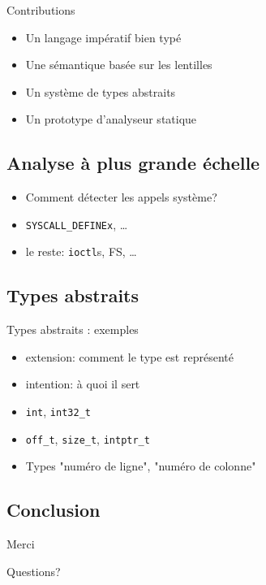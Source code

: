 \documentclass{beamer}
\begin{document}
\begin{frame}{Contributions}
\begin{itemize}
\item Un langage impératif bien typé
\item Une sémantique basée sur les lentilles
\item Un système de types abstraits
\item Un prototype d'analyseur statique
\end{itemize}
\end{frame}

\subsection{Analyse à plus grande échelle}

\begin{frame}
    \begin{itemize}
        \item Comment détecter les appels système?
        \item \texttt{SYSCALL\_DEFINEx}, …
        \item le reste: \texttt{ioctl}s, FS, …
    \end{itemize}
\end{frame}

\subsection{Types abstraits}

\begin{frame}{Types abstraits : exemples}
    \begin{itemize}
        \item extension: comment le type est représenté
        \item intention: à quoi il sert
        \item \texttt{int}, \texttt{int32\_t}
        \item \texttt{off\_t}, \texttt{size\_t}, \texttt{intptr\_t}
        \item Types "numéro de ligne", "numéro de colonne"
    \end{itemize}
\end{frame}

\subsection{Conclusion}

\begin{frame}
    Merci

    Questions?
\end{frame}
\end{document}
